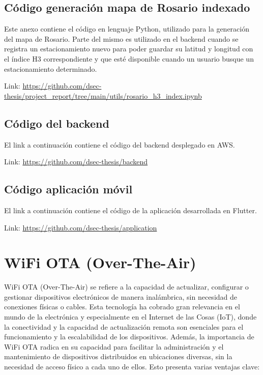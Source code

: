 \begin{appendixd}
    \subsection{Código generación mapa de Rosario indexado}
    Este anexo contiene el código en lenguaje Python, utilizado para la generación del
    mapa de Rosario. Parte del mismo es utilizado en el backend cuando se registra un
    estacionamiento nuevo para poder guardar su latitud y longitud con el índice H3
    correspondiente y que esté disponible cuando un usuario busque un estacionamiento
    determinado.

    Link: \url{https://github.com/dsec-thesis/project_report/tree/main/utils/rosario_h3_index.ipynb}

    \subsection{Código del backend}
    El link a continuación contiene el código del backend desplegado en AWS.

    Link: \url{https://github.com/dsec-thesis/backend}

    \subsection{Código aplicación móvil}
    El link a continuación contiene el código de la aplicación desarrollada en Flutter.

    Link: \url{https://github.com/dsec-thesis/application}



    \clearpage
    \section{WiFi OTA (Over-The-Air)}{\label{configuracion_wifi}}
    WiFi OTA (Over-The-Air) se refiere a la capacidad de actualizar, configurar o
    gestionar dispositivos electrónicos de manera inalámbrica, sin necesidad de
    conexiones físicas o cables. Esta tecnología ha cobrado gran relevancia en el mundo
    de la electrónica y especialmente en el Internet de las Cosas (IoT), donde la
    conectividad y la capacidad de actualización remota son esenciales para el
    funcionamiento y la escalabilidad de los dispositivos. Además, la importancia de WiFi
    OTA radica en su capacidad para facilitar la administración y el mantenimiento de
    dispositivos distribuidos en ubicaciones diversas, sin la necesidad de acceso físico
    a cada uno de ellos. Esto presenta varias ventajas clave:


\end{appendixd}
